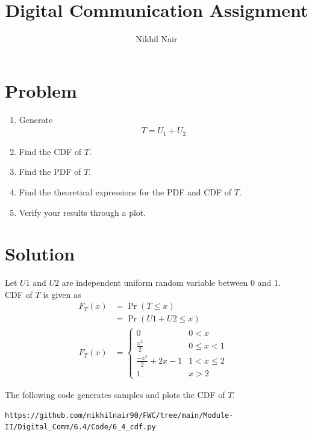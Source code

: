 \documentclass[journal,12pt,twocolumn]{IEEEtran}
\title{\mytitle}
\title{
Digital Communication Assignment
}
\author{Nikhil Nair}
\providecommand{\pr}[1]{\ensuremath{\Pr\left(#1\right)}}
\begin{document}
\maketitle
\bigskip


\section{\textbf{Problem }}
\begin{enumerate}
\item Generate 
	\begin{align}
		T = U_1+U_2  \nonumber
	\end{align}
\item Find the CDF of $T$.
\item Find the PDF of $T$.
\item Find the theoretical expressions for the PDF and CDF of $T$.
\item Verify your results through a plot. 
\end{enumerate}

\section{\textbf{Solution }}
Let $U1$ and $U2$ are independent uniform random variable between 0 and 1.
\\ 
CDF of $T$ is given as
\begin{align}
F_{T}(x) &= \pr{T \le x}&   \label{eq:1}
\\
&= \pr{U1+U2 \le x}&
\\
F_{T}(x)  &= 
\begin{cases}
0 & 0 < x 
\\
\frac{x^2}{2} & 0 \le x < 1
\\
\frac{-x^2}{2}+2x-1 & 1 < x \le 2 
\\
1 &  x > 2                \label{eq:3}
\end{cases}
\end{align}


The following code generates samples and plots the CDF of $T$.

\begin{lstlisting}
https://github.com/nikhilnair90/FWC/tree/main/Module-II/Digital_Comm/6.4/Code/6_4_cdf.py
\end{lstlisting}
\end{document}
